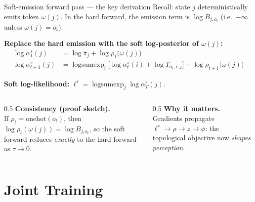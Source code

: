 \documentclass[aspectratio=169,10pt]{beamer}
\DeclareMathOperator*{\lse}{logsumexp}
\begin{document}
\begin{frame}{Soft-emission forward pass --- the key derivation}
  Recall: state $j$ deterministically emits token $\omega(j)$.
  In the hard forward, the emission term is $\log B_{j, o_t}$
  (i.e.\ $-\infty$ unless $\omega(j) = o_t$).

  \vspace{0.3em}
  \textbf{Replace the hard emission with the soft log-posterior of $\omega(j)$:}
  \begin{align*}
    \log\alpha^{s}_1(j) &= \log\bar\pi_j + \log\rho_1\!\bigl(\omega(j)\bigr) \\
    \log\alpha^{s}_{t+1}(j) &= \lse_i\bigl[\log\alpha^{s}_t(i) + \log T_{a_t,i,j}\bigr]
                                 + \log\rho_{t+1}\!\bigl(\omega(j)\bigr)
  \end{align*}

  \vspace{-0.4em}
  \textbf{Soft log-likelihood:}\quad
  $\ell^{s} = \lse_j \log\alpha^{s}_T(j)$.

  \vspace{0.5em}
  \begin{columns}[T,onlytextwidth]
    \begin{column}{0.5\textwidth}
      \textbf{Consistency (proof sketch).}\\
      If $\rho_t = \mathrm{onehot}(o_t)$, then
      $\log\rho_t(\omega(j))=\log B_{j,o_t}$, so the soft forward reduces
      \emph{exactly} to the hard forward as $\tau\to 0$.
    \end{column}
    \begin{column}{0.5\textwidth}
      \textbf{Why it matters.}\\
      Gradients propagate
      $\ell^{s}\to\rho\to z\to\phi$:
      the topological objective now \emph{shapes perception}.
    \end{column}
  \end{columns}
\end{frame}

\section{Joint Training}
\end{document}
